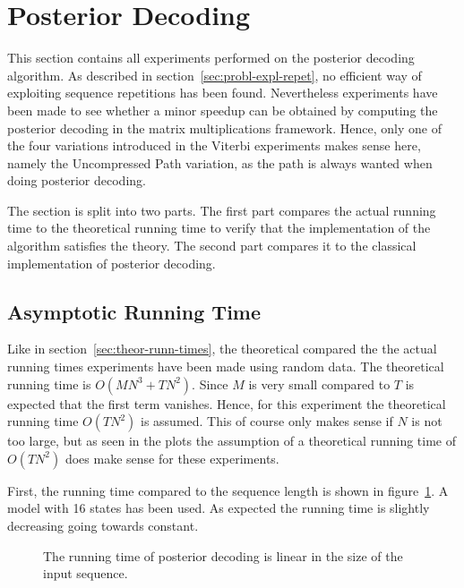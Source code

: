 \section{Posterior Decoding}

This section contains all experiments performed on the posterior decoding
algorithm. As described in section~\ref{sec:probl-expl-repet}, no efficient way
of exploiting sequence repetitions has been found. Nevertheless experiments
have been made to see whether a minor speedup can be obtained by computing the
posterior decoding in the matrix multiplications framework. Hence, only one of
the four variations introduced in the Viterbi experiments makes sense here,
namely the Uncompressed Path variation, as the path is always wanted when doing
posterior decoding.

The section is split into two parts. The first part compares the actual
running time to the theoretical running time to verify that the implementation
of the algorithm satisfies the theory. The second part compares it to the
classical implementation of posterior decoding.

\subsection{Asymptotic Running Time}

Like in section~\ref{sec:theor-runn-times}, the theoretical compared the the
actual running times experiments have been made using random data. The
theoretical running time is $O(M N^3 + TN^2)$. Since $M$ is very small compared
to $T$ is expected that the first term vanishes. Hence, for this experiment the
theoretical running time $O(TN^2)$ is assumed. This of course only makes sense
if $N$ is not too large, but as seen in the plots the assumption of a
theoretical running time of $O(TN^2)$ does make sense for these experiments.

First, the running time compared to the sequence length is shown in
figure~\ref{fig:posterior_n}. A model with 16 states has been used. As expected
the running time is slightly decreasing going towards constant. 

\begin{figure}
  \centering
  
  \caption{The running time of posterior decoding is linear in the size of the
    input sequence.}
  \label{fig:posterior_n}
\end{figure}

